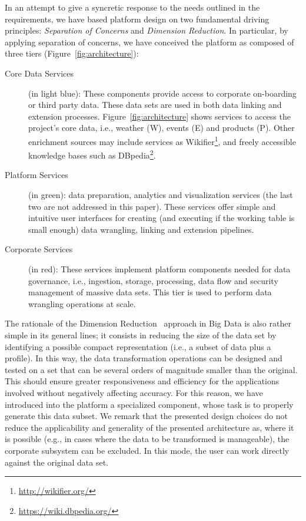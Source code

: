 In an attempt to give a syncretic response to the needs outlined in the requirements, we have based platform design on two fundamental driving principles:  \textit{Separation of Concerns} and \textit{Dimension Reduction}.  
In particular, by applying separation of concerns, we have conceived the platform as composed of three tiers (Figure~\ref{fig:architecture}):

\begin{description}
    \item[Core Data Services] (in light blue): These components provide access to corporate on-boarding or third party data. These data sets are used in both data linking and extension processes. Figure~\ref{fig:architecture} shows services to access the project's core data, i.e., weather (W), events (E) and products (P). Other enrichment sources may include services as Wikifier\footnote{\url{http://wikifier.org/}}, and freely accessible knowledge bases such as DBpedia\footnote{\url{https://wiki.dbpedia.org/}}.
    \item[Platform Services] (in green): data preparation, analytics and visualization services (the last two are not addressed in this paper). These services offer simple and intuitive user interfaces for creating (and executing if the working table is small enough) data wrangling, linking and extension pipelines.
    \item[Corporate Services] (in red): These services implement platform components needed for data governance, i.e., ingestion, storage, processing, data flow and security management of massive data sets. This tier is used to perform data wrangling operations at scale. 
\end{description}


The rationale of the Dimension Reduction~\cite{rojas2017sampling, ur2016big} approach in Big Data is also rather simple in its general lines; it consists in reducing the size of the data set by identifying a possible compact representation (i.e., a subset of data plus a profile). In this way, the data transformation operations can be designed and tested on a set that can be several orders of magnitude smaller than the original. This should ensure greater responsiveness and efficiency for the applications involved without negatively affecting accuracy. For this reason, we have introduced into the platform a specialized component, whose task is to properly generate this data subset. 
We remark that the presented design choices do not reduce the applicability and generality of the presented architecture as, where it is possible (e.g., in cases where the data to be transformed is manageable), the corporate subsystem can be excluded. In this mode, the user can work directly against the original data set.


